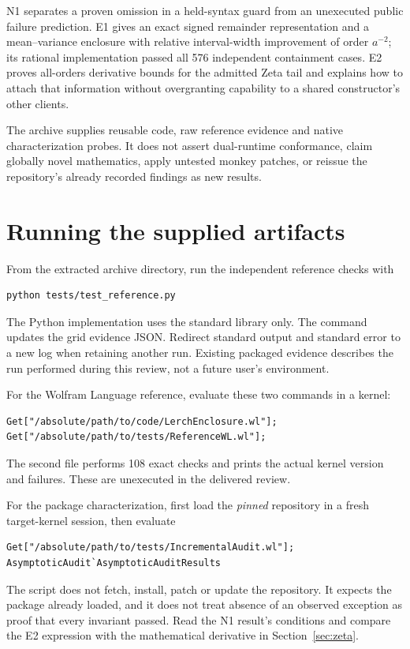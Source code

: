 \documentclass[11pt,a4paper]{article}
\begin{document}
N1 separates a proven omission in a held-syntax guard from an unexecuted public failure prediction. E1 gives an exact signed remainder representation and a mean--variance enclosure with relative interval-width improvement of order $a^{-2}$; its rational implementation passed all 576 independent containment cases. E2 proves all-orders derivative bounds for the admitted Zeta tail and explains how to attach that information without overgranting capability to a shared constructor's other clients.

The archive supplies reusable code, raw reference evidence and native characterization probes. It does not assert dual-runtime conformance, claim globally novel mathematics, apply untested monkey patches, or reissue the repository's already recorded findings as new results.

\appendix
\section{Running the supplied artifacts}\label{app:run}

From the extracted archive directory, run the independent reference checks with
\begin{lstlisting}
python tests/test_reference.py
\end{lstlisting}
The Python implementation uses the standard library only. The command updates the grid evidence JSON. Redirect standard output and standard error to a new log when retaining another run. Existing packaged evidence describes the run performed during this review, not a future user's environment.

For the Wolfram Language reference, evaluate these two commands in a kernel:
\begin{lstlisting}
Get["/absolute/path/to/code/LerchEnclosure.wl"];
Get["/absolute/path/to/tests/ReferenceWL.wl"];
\end{lstlisting}
The second file performs 108 exact checks and prints the actual kernel version and failures. These are unexecuted in the delivered review.

For the package characterization, first load the \emph{pinned} repository in a fresh target-kernel session, then evaluate
\begin{lstlisting}
Get["/absolute/path/to/tests/IncrementalAudit.wl"];
AsymptoticAudit`AsymptoticAuditResults
\end{lstlisting}
The script does not fetch, install, patch or update the repository. It expects the package already loaded, and it does not treat absence of an observed exception as proof that every invariant passed. Read the N1 result's conditions and compare the E2 expression with the mathematical derivative in Section~\ref{sec:zeta}.
\end{document}
